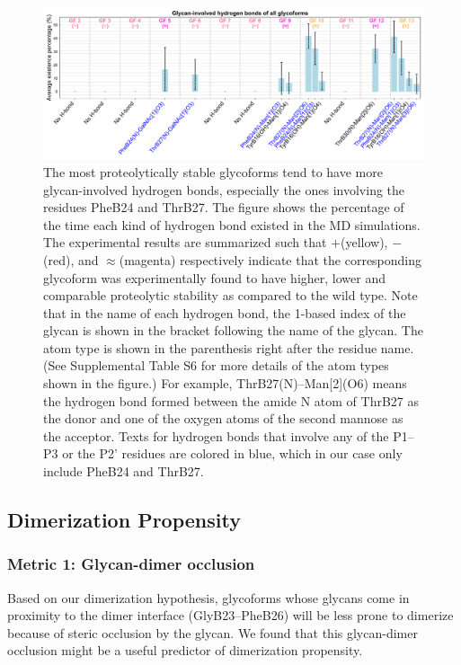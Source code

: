 \documentclass[sn-vancouver]{sn-jnl}
\begin{document}
\begin{figure}[H]
\centering
\includegraphics[width=\textwidth]{Figures/hbond_results.png}
\caption{The most proteolytically stable glycoforms tend to have more glycan-involved hydrogen bonds, especially the ones involving the residues PheB24 and ThrB27. The figure shows the percentage of the time each kind of hydrogen bond existed in the MD simulations. The experimental results are summarized such that $+$(yellow), $-$(red), and $\approx$(magenta) respectively indicate that the corresponding glycoform was experimentally found to have higher, lower and comparable proteolytic stability as compared to the wild type. Note that in the name of each hydrogen bond, the 1-based index of the glycan is shown in the bracket following the name of the glycan. The atom type is shown in the parenthesis right after the residue name. (See Supplemental Table S6 for more details of the atom types shown in the figure.) For example, ThrB27(N)--Man[2](O6) means the hydrogen bond formed between the amide N atom of ThrB27 as the donor and one of the oxygen atoms of the second mannose as the acceptor. Texts for hydrogen bonds that involve any of the P1--P3 or the P2' residues are colored in blue, which in our case only include PheB24 and ThrB27.}
\label{result_hbond}
\end{figure}

\subsection{Dimerization Propensity}
\subsubsection{Metric 1: Glycan-dimer occlusion}
Based on our dimerization hypothesis, glycoforms whose glycans come in proximity to the dimer interface (GlyB23--PheB26) will be less prone to dimerize because of steric occlusion by the glycan. We found that this glycan-dimer occlusion might be a useful predictor of dimerization propensity. 
\end{document}
